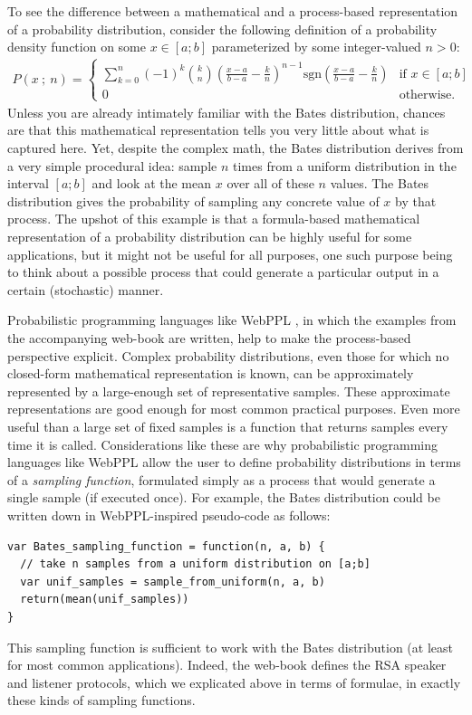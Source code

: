 \documentclass{sp}
\begin{document}
To see the difference between a mathematical and a process-based representation of a probability distribution, consider the following definition of a probability density function on some $x \in [a;b]$ parameterized by some integer-valued $n>0$:
\begin{align*}
  P(x \ ; \ n) =
  \begin{cases}
    \sum_{k=0}^{n}(-1)^{k}\binom{k}{n} \left( \frac{x-a}{b-a} - \frac{k}{n} \right)^{n-1} \textrm{sgn} \left( \frac{x-a}{b-a} - \frac{k}{n} \right) & \text{if } x \in [a;b]\\
    0 & \text{otherwise}.
  \end{cases}
\end{align*}
Unless you are already intimately familiar with the Bates distribution, chances are that this mathematical representation tells you very little about what is captured here.
Yet, despite the complex math, the Bates distribution derives from a very simple procedural idea:
sample $n$ times from a uniform distribution in the interval $[a;b]$ and look at the mean $x$ over all of these $n$ values.
The Bates distribution gives the probability of sampling any concrete value of $x$ by that process.
The upshot of this example is that a formula-based mathematical representation of a probability distribution can be highly useful for some applications, but it might not be useful for all purposes, one such purpose being to think about a possible process that could generate a particular output in a certain (stochastic) manner.

Probabilistic programming languages like WebPPL \citep{goodmanstuhlmuller2014}, in which the examples from the accompanying web-book are written, help to make the process-based perspective explicit.
Complex probability distributions, even those for which no closed-form mathematical representation is known, can be approximately represented by a large-enough set of representative samples.
These approximate representations are good enough for most common practical purposes.
Even more useful than a large set of fixed samples is a function that returns samples every time it is called.
Considerations like these are why probabilistic programming languages like WebPPL allow the user to define probability distributions in terms of a \emph{sampling function}, formulated simply as a process that would generate a single sample (if executed once).
For example, the Bates distribution could be written down in WebPPL-inspired pseudo-code as follows: 
\begin{lstlisting}
var Bates_sampling_function = function(n, a, b) {
  // take n samples from a uniform distribution on [a;b]
  var unif_samples = sample_from_uniform(n, a, b)
  return(mean(unif_samples))
}
\end{lstlisting}
This sampling function is sufficient to work with the Bates distribution (at least for most common applications).
Indeed, the web-book defines the RSA speaker and listener protocols, which we explicated above in terms of formulae, in exactly these kinds of sampling functions.
\end{document}
